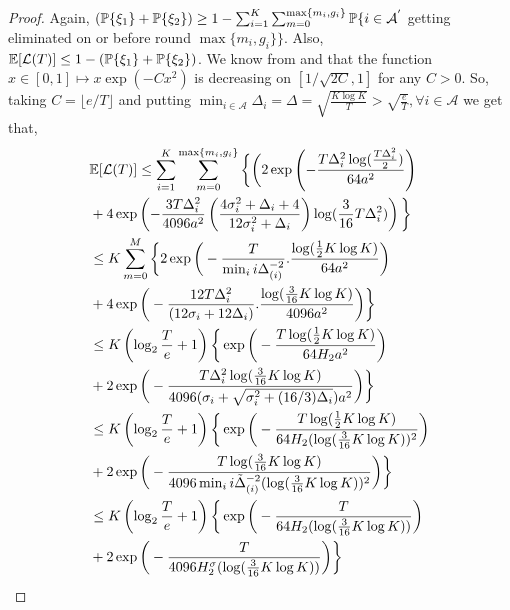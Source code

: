 \begin{proof}
Again, $(\mathbb{P}\lbrace \xi_1\rbrace  + \mathbb{P}\lbrace \xi_2 \rbrace)\geq 1- \sum_{i=1}^{K}\sum_{m=0}^{\max\lbrace m_{i} ,g_{i}\rbrace}\mathbb{P}\lbrace i\in \mathcal{A}^{'}$ getting eliminated on or before round $\max\lbrace m_i, g_i\rbrace \rbrace $.
Also, $\mathbb{E}[\mathcal{L}(T)]\le 1- (\mathbb{P}\lbrace \xi_1\rbrace  + \mathbb{P}\lbrace \xi_2 \rbrace) $. We know from \cite{bubeck2011pure} and \cite{auer2010ucb} that the function $x\in [0,1]\mapsto x\exp(-Cx^2)$ is  decreasing on $[1/\sqrt{2C},1]$ for any $C>0$. So, taking $C=\lfloor e/T\rfloor$ and putting $\min_{i\in \mathcal{A}}\Delta_i =\Delta =\sqrt{\frac{K\log K}{T}} > \sqrt{\frac{e}{T}},\forall i\in \mathcal{A}$ we get that,
\begin{align*}
&\mathbb{E}[\mathcal{L}(T)] \leq \sum_{i=1}^{K}\sum_{m=0}^{\max\lbrace m_{i} ,g_{i}\rbrace}\bigg\lbrace \bigg( 2\exp\left(-\frac{T\Delta_{i}^{2} \log(\frac{T\Delta_{i}^{2}}{2})}{64 a^2 }\right) \\
& + 4\exp\left(- \frac{3T\Delta_{i}^{2}}{4096 a^2 } \left(\frac{4\sigma_{i}^{2}+\Delta_{i}+4}{12\sigma_{i}^{2}+\Delta_{i}}\right) \log( \frac{3}{16} T\Delta_{i}^{2}) \right)\bigg\rbrace\\
& \leq K\sum_{m=0}^{M}\bigg\lbrace 2\exp\bigg( -\frac{T}{\min_{i}i\Delta_{(i)}^{-2}}.\frac{\log (\frac{1}{2} K\log K)}{64 a^2 }\bigg)\\
& + 4\exp\bigg(- \frac{12T\Delta_{i}^{2}}{(12\sigma_{i}+ 12\Delta_{i})}.\frac{\log (\frac{3}{16} K\log K)}{4096 a^2 } \bigg)\bigg\rbrace\\
&\leq K\left(\log_2\frac{T}{e}+1\right)\bigg\lbrace\exp\bigg( -\frac{T\log ( \frac{1}{2} K\log K)}{ 64 H_2 a^2}\bigg)\\
& + 2\exp\bigg(- \frac{T\Delta_{i}^{2}\log ( \frac{3}{16} K\log K)}{4096 (\sigma_{i} + \sqrt{\sigma_{i}^{2} + (16/3)\Delta_{i}}) a^2} \bigg)\bigg\rbrace\\
&\leq K\left(\log_2\frac{T}{e}+1\right)\bigg\lbrace\exp\bigg( -\frac{T\log ( \frac{1}{2} K\log K)}{ 64 H_2 (\log(\frac{3}{16} K\log K))^{2}}\bigg)\\
& + 2\exp\bigg(- \frac{T\log ( \frac{3}{16} K\log K)}{4096 \min_{i}i\tilde{\Delta}_{(i)}^{-2} (\log(\frac{3}{16} K\log K))^{2}} \bigg)\bigg\rbrace\\
&\leq K\left(\log_2\frac{T}{e}+1\right)\bigg\lbrace\exp\bigg( -\frac{T}{ 64 H_2 (\log(\frac{3}{16} K\log K))}\bigg)\\
& + 2\exp\bigg(- \frac{T}{4096 H_{2}^{\sigma} (\log(\frac{3}{16} K\log K))} \bigg)\bigg\rbrace\\
\end{align*}
\end{proof}

